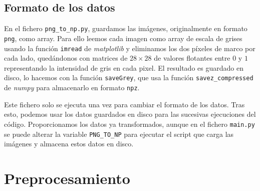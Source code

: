 \documentclass[a4]{article}
\begin{document}


\subsection{Formato de los datos}

En el fichero \texttt{png\_to\_np.py}, guardamos las imágenes,
originalmente en formato \texttt{png}, como array. Para ello leemos
cada imagen como array de escala de grises usando la función
\texttt{imread} de \textit{matplotlib} y eliminamos los dos píxeles de
marco por cada lado, quedándonos con matrices de $28 \times 28$ de
valores flotantes entre $0$ y $1$ representando la intensidad de gris
en cada pixel. El resultado es guardado en disco, lo hacemos con la
función \texttt{saveGrey}, que usa la función
\texttt{savez\_compressed} de \textit{numpy} para almacenarlo en
formato \texttt{npz}.

Este fichero solo se ejecuta una vez para cambiar el formato de los
datos. Tras esto, podemos usar los datos guardados en disco para las
sucesivas ejecuciones del código. Proporcionamos los datos ya
transformados, aunque en el fichero \texttt{main.py} se puede alterar
la variable \texttt{PNG\_TO\_NP} para ejecutar el script que carga las
imágenes y almacena estos datos en disco.

\section{Preprocesamiento}

\end{document}
